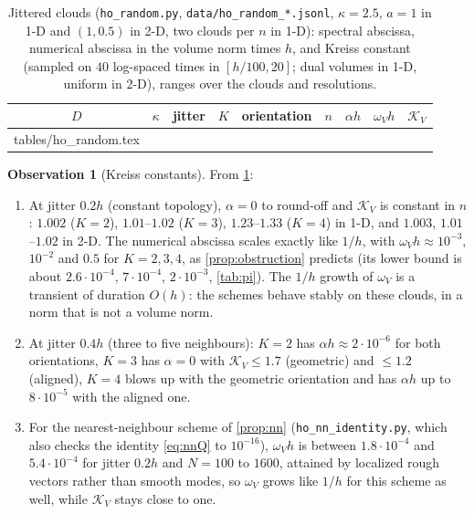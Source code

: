 \documentclass[11pt,a4paper]{article}
\makeatletter
\theoremstyle{plain}
\theoremstyle{definition}
\newtheorem{observation}[theorem]{Observation}
\theoremstyle{remark}
\numberwithin{equation}{section}
\newcommand{\inputrows}[1]{\@@input #1 }%
\makeatother
\begin{document}
\begin{table}[t]
\centering
\caption{Jittered clouds (\texttt{ho\_random.py}, \texttt{data/ho\_random\_*.jsonl}, $\kappa=2.5$, $a=1$ in 1-D and $(1,0.5)$ in 2-D, two clouds per $n$ in 1-D): spectral abscissa, numerical abscissa in the volume norm times $h$, and Kreiss constant (sampled on $40$ log-spaced times in $[h/100,20]$; dual volumes in 1-D, uniform in 2-D), ranges over the clouds and resolutions.}\label{tab:random}
\small
\begin{tabular}{cccclcccc}
\toprule
$D$ & $\kappa$ & jitter & $K$ & orientation & $n$ & $\alpha h$ & $\omega_Vh$ & $\mathcal K_V$\\
\midrule
\inputrows{tables/ho_random.tex}
\bottomrule
\end{tabular}
\end{table}

\begin{observation}[Kreiss constants]\label{obs:random}
From \cref{tab:random}:
\begin{enumerate}[label=(\roman*)]
\item At jitter $0.2h$ (constant topology), $\alpha=0$ to round-off and $\mathcal K_V$ is constant in $n$: $1.002$ ($K=2$), $1.01$--$1.02$ ($K=3$), $1.23$--$1.33$ ($K=4$) in 1-D, and $1.003$, $1.01$--$1.02$ in 2-D. The numerical abscissa scales exactly like $1/h$, with $\omega_Vh\approx10^{-3}$, $10^{-2}$ and $0.5$ for $K=2,3,4$, as \cref{prop:obstruction} predicts (its lower bound is about $2.6\cdot10^{-4}$, $7\cdot10^{-4}$, $2\cdot10^{-3}$, \cref{tab:pi}). The $1/h$ growth of $\omega_V$ is a transient of duration $O(h)$: the schemes behave stably on these clouds, in a norm that is not a volume norm.
\item At jitter $0.4h$ (three to five neighbours): $K=2$ has $\alpha h\approx2\cdot10^{-6}$ for both orientations, $K=3$ has $\alpha=0$ with $\mathcal K_V\le1.7$ (geometric) and $\le1.2$ (aligned), $K=4$ blows up with the geometric orientation and has $\alpha h$ up to $8\cdot10^{-5}$ with the aligned one.
\item For the nearest-neighbour scheme of \cref{prop:nn} (\texttt{ho\_nn\_identity.py}, which also checks the identity \eqref{eq:nnQ} to $10^{-16}$), $\omega_Vh$ is between $1.8\cdot10^{-4}$ and $5.4\cdot10^{-4}$ for jitter $0.2h$ and $N=100$ to $1600$, attained by localized rough vectors rather than smooth modes, so $\omega_V$ grows like $1/h$ for this scheme as well, while $\mathcal K_V$ stays close to one.
\end{enumerate}
\end{observation}
\end{document}
